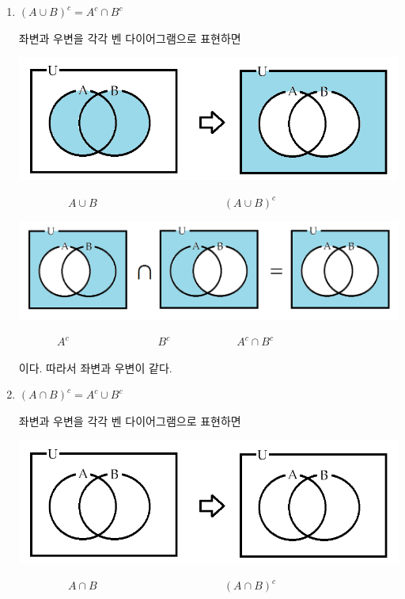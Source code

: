 \documentclass{oblivoir}
\begin{document}
%
\begin{enumerate}\label{properties7}
\item
\((A\cup B)^c=A^c\cap B^c\)
\begin{mdframed}
좌변과 우변을 각각 벤 다이어그램으로 표현하면
\par
\includegraphics[width=.9\textwidth]{properties_7-1}
\par\vspace{-10pt}
\(\qquad\qquad\:\: A\cup B\qquad\qquad\qquad\qquad\qquad\quad\:\:(A\cup B)^c\)
\par
\includegraphics[width=.9\textwidth]{properties_7-2}
\par\vspace{-10pt}
\(\qquad\quad\:\:A^c\qquad\qquad\qquad\qquad B^c
\qquad\qquad\qquad A^c\cap B^c\)
\par
이다.
따라서 좌변과 우변이 같다.
\end{mdframed}
\item
\((A\cap B)^c=A^c\cup B^c\)
\begin{mdframed}
좌변과 우변을 각각 벤 다이어그램으로 표현하면
\par
\includegraphics[width=.9\textwidth]{two_set_rule-complement}
\par\vspace{-10pt}
\(\qquad\qquad\:\: A\cap B\qquad\qquad\qquad\qquad\qquad\quad\:\:(A\cap B)^c\)
\par

\end{mdframed}
\end{enumerate}
\end{document}
